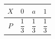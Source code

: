\begin{tabular}{|c|c|c|c|}
\hline
$X$ & $0$ & $a$ & $1$ \\
\hline
$P$ & $\dfrac{1}{3}$ & $\dfrac{1}{3}$ & $\dfrac{1}{3}$ \\
\hline
\end{tabular}
